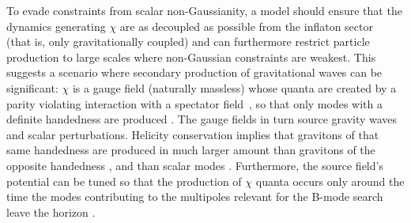 To evade constraints from scalar non-Gaussianity, a model should ensure that the dynamics generating $\chi$ are as decoupled as possible from the inflaton sector~\cite{Barnaby:2012xt} (that is, only gravitationally coupled) and can furthermore restrict particle production to large scales where non-Gaussian constraints are weakest. This suggests a scenario where secondary production of gravitational waves can be significant: $\chi$ is a gauge field (naturally massless) whose quanta are created by a parity violating interaction with a spectator field~\cite{Cook:2011hg,Barnaby:2012xt}, so that only modes with a definite handedness are produced \cite{Anber:2006xt}. The gauge fields in turn source gravity waves and scalar perturbations. Helicity conservation implies that gravitons of that same handedness are produced in much larger amount than gravitons of the opposite handedness \cite{Sorbo:2011rz}, and than scalar modes \cite{Barnaby:2012xt}. Furthermore, the source field's potential can be tuned so that the production of $\chi$ quanta occurs only around the time the modes contributing to the multipoles relevant for the B-mode search leave the horizon \cite{Namba:2015gja}.
